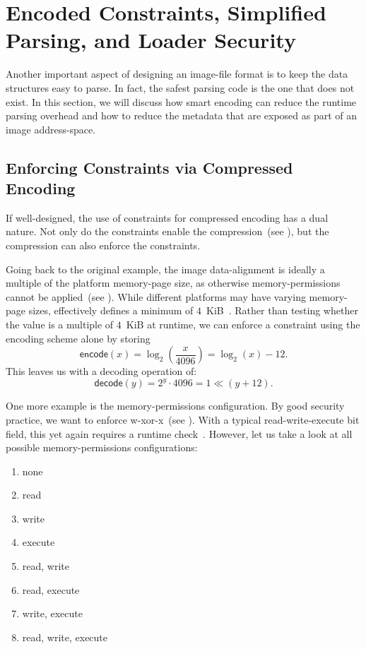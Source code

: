 \section{Encoded Constraints, Simplified Parsing, and Loader Security}
\label{sec:encoding_sec}

Another important aspect of designing an \gls{image-file} format is to keep the data structures easy to parse. In fact, the safest parsing code is the one that does not exist. In this section, we will discuss how smart encoding can reduce the runtime parsing overhead and how to reduce the metadata that are exposed as part of an \gls{image} \gls{address-space}.

\subsection{Enforcing Constraints via Compressed Encoding}

If well-designed, the use of constraints for compressed encoding has a dual nature. Not only do the constraints enable the compression~(see ), but the compression can also enforce the constraints.

Going back to the original example, the \gls{image} \gls{data-alignment} is ideally a multiple of the platform \gls{memory-page} size, as otherwise \gls{memory-permissions} cannot be applied~(see ). While different platforms may have varying \gls{memory-page} sizes,  effectively defines a minimum of $4$~KiB~\cite{uefi-spec}. Rather than testing whether the value is a multiple of $4$~KiB at runtime, we can enforce a constraint using the encoding scheme alone by storing
\[ \mathsf{encode}(x) = \log_2(\frac{x}{4096}) = \log_2(x) - 12. \]
This leaves us with a decoding operation of:
\[ \mathsf{decode}(y) = 2^y \cdot 4096 = 1 \ll (y + 12). \]

One more example is the \gls{memory-permissions} configuration. By good security practice, we want to enforce \gls{w-xor-x}~(see ). With a typical read-write-execute bit field, this yet again requires a runtime check~\cite{audk}. However, let us take a look at all possible \gls{memory-permissions} configurations:
\begin{multicols}{2}
  \begin{enumerate}
    \item none \label{mem_perm_none}
    \item read \label{mem_perm_r}
    \item write \label{mem_perm_w}
    \item execute \label{mem_perm_x}
    \item read, write \label{mem_perm_rw}
    \item read, execute \label{mem_perm_rx}
    \item write, execute \label{mem_perm_wx}
    \item read, write, execute \label{mem_perm_rwx}
  \end{enumerate}
\end{multicols}

